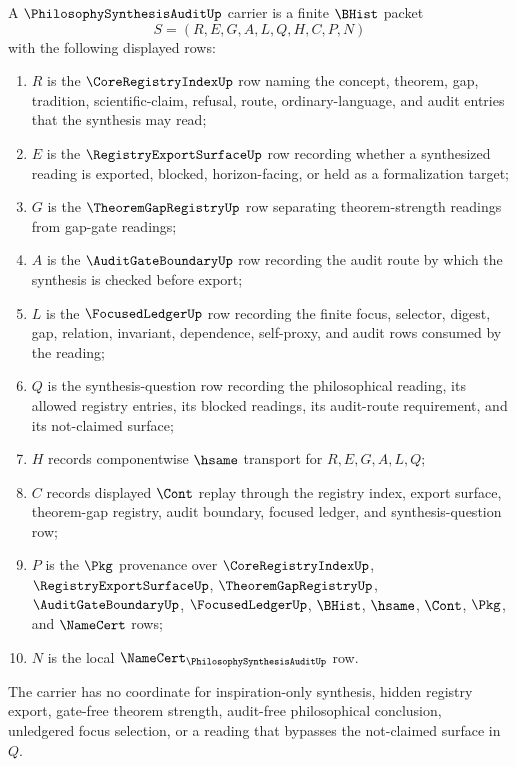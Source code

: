 \begin{definition}
\label{def:philosophy-synthesis-audit-carrier}
A $\PhilosophySynthesisAuditUp$ carrier is a finite $\BHist$ packet
$$
S=(R,E,G,A,L,Q,H,C,P,N)
$$
with the following displayed rows:
\begin{enumerate}
\item $R$ is the $\CoreRegistryIndexUp$ row naming the concept, theorem, gap, tradition, scientific-claim, refusal, route, ordinary-language, and audit entries that the synthesis may read;
\item $E$ is the $\RegistryExportSurfaceUp$ row recording whether a synthesized reading is exported, blocked, horizon-facing, or held as a formalization target;
\item $G$ is the $\TheoremGapRegistryUp$ row separating theorem-strength readings from gap-gate readings;
\item $A$ is the $\AuditGateBoundaryUp$ row recording the audit route by which the synthesis is checked before export;
\item $L$ is the $\FocusedLedgerUp$ row recording the finite focus, selector, digest, gap, relation, invariant, dependence, self-proxy, and audit rows consumed by the reading;
\item $Q$ is the synthesis-question row recording the philosophical reading, its allowed registry entries, its blocked readings, its audit-route requirement, and its not-claimed surface;
\item $H$ records componentwise $\hsame$ transport for $R,E,G,A,L,Q$;
\item $C$ records displayed $\Cont$ replay through the registry index, export surface, theorem-gap registry, audit boundary, focused ledger, and synthesis-question row;
\item $P$ is the $\Pkg$ provenance over $\CoreRegistryIndexUp$, $\RegistryExportSurfaceUp$, $\TheoremGapRegistryUp$, $\AuditGateBoundaryUp$, $\FocusedLedgerUp$, $\BHist$, $\hsame$, $\Cont$, $\Pkg$, and $\NameCert$ rows;
\item $N$ is the local $\NameCert_{\PhilosophySynthesisAuditUp}$ row.
\end{enumerate}
The carrier has no coordinate for inspiration-only synthesis, hidden registry export, gate-free theorem strength, audit-free philosophical conclusion, unledgered focus selection, or a reading that bypasses the not-claimed surface in $Q$.
\end{definition}

